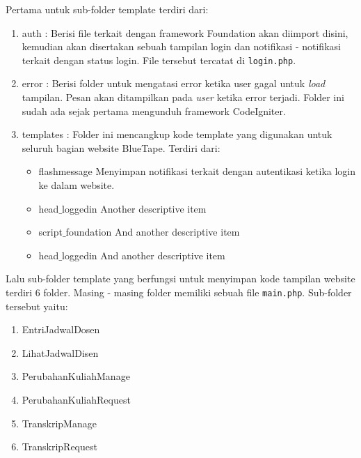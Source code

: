 Pertama untuk sub-folder template terdiri dari: 
\begin{enumerate}
	\item auth	: Berisi file terkait dengan framework Foundation akan diimport disini, kemudian akan disertakan sebuah tampilan login dan notifikasi - notifikasi terkait dengan status login. File tersebut tercatat di \texttt{login.php}.
	\item error	: Berisi folder untuk mengatasi error ketika user gagal untuk \textit{load} tampilan. Pesan akan ditampilkan pada \textit{user} ketika error terjadi. Folder ini sudah ada sejak pertama mengunduh framework CodeIgniter.
	\item templates	: Folder ini mencangkup kode template yang digunakan untuk seluruh bagian website BlueTape. Terdiri dari:
	\begin{itemize}
		\item flashmessage Menyimpan notifikasi terkait dengan autentikasi ketika login ke dalam website.
		\item head$\_$loggedin Another descriptive item
		\item script$\_$foundation And another descriptive item
		\item head$\_$loggedin And another descriptive item
	\end{itemize}
\end{enumerate}

Lalu sub-folder template yang berfungsi untuk menyimpan kode tampilan website terdiri 6 folder. Masing - masing folder memiliki sebuah file \texttt{main.php}. Sub-folder tersebut yaitu:
\begin{enumerate}
	\item EntriJadwalDosen
	\item LihatJadwalDisen
	\item PerubahanKuliahManage
	\item PerubahanKuliahRequest
	\item TranskripManage
	\item TranskripRequest
\end{enumerate}

